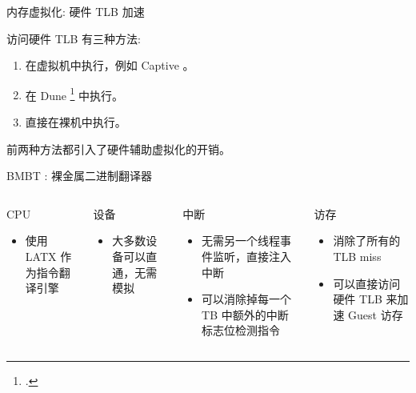 \documentclass{beamer}
\begin{document}
\begin{frame}{内存虚拟化: 硬件 TLB 加速}
	\begin{flushleft}
		访问硬件 TLB 有三种方法:
	\end{flushleft}
	\begin{enumerate}
		\item 在虚拟机中执行，例如 Captive 。
		\item 在 Dune \footcite{belay2012dune} 中执行。
		\item 直接在裸机中执行。
	\end{enumerate}
	前两种方法都引入了硬件辅助虚拟化的开销。
\end{frame}

\begin{frame}{BMBT : 裸金属二进制翻译器}
	\begin{columns}[T,onlytextwidth]
		\begin{exampleblock}{CPU}
			\begin{itemize}
				\item 使用 LATX 作为指令翻译引擎
			\end{itemize}
		\end{exampleblock}

		\begin{exampleblock}{设备}
			\begin{itemize}
				\item 大多数设备可以直通，无需模拟
			\end{itemize}
		\end{exampleblock}

		\begin{exampleblock}{中断}
			\begin{itemize}
				\item 无需另一个线程事件监听，直接注入中断
				\item 可以消除掉每一个 TB 中额外的中断标志位检测指令
			\end{itemize}
		\end{exampleblock}

		\begin{exampleblock}{访存}
			\begin{itemize}
				\item 消除了所有的 TLB miss
				\item 可以直接访问硬件 TLB 来加速 Guest 访存
			\end{itemize}
		\end{exampleblock}
	\end{columns}
\end{frame}
\end{document}
